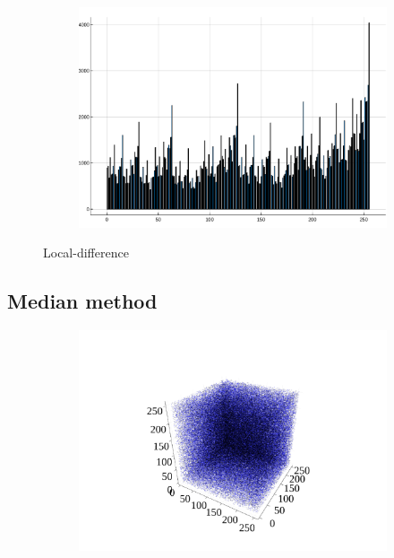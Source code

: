 \documentclass[10pt, final]{article}
\begin{document}
\begin{multicols}{2}
\begin{mdframed}
\begin{figure}[H]
        \begin{subfigure}{\textwidth}
            \centering
            \includegraphics[width = \textwidth]{../random_img/d2histogram.pdf}
            \caption{}
        \end{subfigure}
        \caption{Local-difference}
    \end{figure}
\end{mdframed}
\subsection*{Median method}
\begin{mdframed}
    \begin{figure}[H]
        \begin{subfigure}{\textwidth}
            \centering
            \includegraphics[width = \textwidth]{../random_img/naif-scatter3d.pdf}
            \caption{}
        \end{subfigure}


\end{figure}
\end{mdframed}
\end{multicols}
\end{document}
